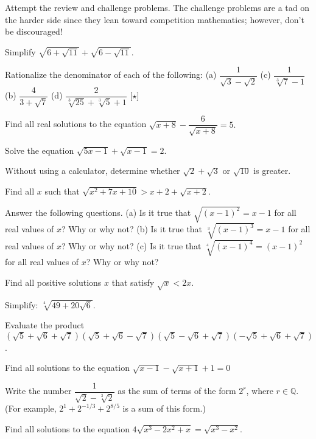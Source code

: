 \documentclass[../book.tex]{subfiles}
\begin{document}
Attempt the review and challenge problems.  The challenge problems are a tad on the harder side since they lean toward competition mathematics; however, don't be discouraged!
\begin{reviewset}
\item Simplify $\sqrt{6+\sqrt{11}}+\sqrt{6-\sqrt{11}}$. \vspace{3mm}
\item Rationalize the denominator of each of the following: \newline 
(a) $\dfrac{1}{\sqrt{3}-\sqrt{2}}$ \hspace{40mm} (c) $\dfrac{1}{\sqrt[3]{7}-1}$ \newline
(b) $\dfrac{4}{3+\sqrt{7}}$ \hspace{43mm} (d) $\dfrac{2}{\sqrt[3]{25}+\sqrt[3]{5}+1}$ [$\star$]  \vspace{3mm}
\item Find all real solutions to the equation $\sqrt{x+8}-\dfrac{6}{\sqrt{x+8}}=5.$ \vspace{3mm}
\item Solve the equation $\sqrt{5x-1}+\sqrt{x-1}=2$. \vspace{3mm}
\item Without using a calculator, determine whether $\sqrt{2}+\sqrt{3}$ or $\sqrt{10}$ is greater. \vspace{3mm}
\item Find all $x$ such that $\sqrt{x^2+7x+10}>x+2+\sqrt{x+2}$. \vspace{3mm}
\item Answer the following questions. \newline 
(a) Is it true that $\sqrt{(x-1)^2}=x-1$ for all real values of $x$? Why or why not? \newline 
(b) Is it true that $\sqrt[3]{(x-1)^3}=x-1$ for all real values of $x$? Why or why not? \newline 
(c) Is it true that $\sqrt[4]{(x-1)^4}=(x-1)^2$ for all real values of $x$? Why or why not? \vspace{3mm}
\item Find all positive solutions $x$ that satisfy $\sqrt{x}<2x$. \vspace{3mm}
\item Simplify: $\sqrt[4]{49+20\sqrt{6}}$. \vspace{3mm}
\item Evaluate the product $\left(\sqrt{5}+\sqrt{6}+\sqrt{7}\right)\left(\sqrt{5}+\sqrt{6}-\sqrt{7}\right)\left(\sqrt{5}-\sqrt{6}+\sqrt{7}\right)\left(-\sqrt{5}+\sqrt{6}+\sqrt{7}\right)$. \vspace{3mm}
\item Find all solutions to the equation $\sqrt{x-1}-\sqrt{x+1}+1=0$ \vspace{3mm}
\item Write the number $\dfrac{1}{\sqrt{2}-\sqrt[3]{2}}$ as the sum of terms of the form $2^r$, where $r\in\mathbb{Q}$. (For example, $2^1+2^{-1/3}+2^{8/5}$ is a sum of this form.) \vspace{3mm}
\item Find all solutions to the equation $4\sqrt{x^3-2x^2+x}=\sqrt{x^3-x^2}$. \vspace{3mm}
\end{reviewset}
\end{document}

